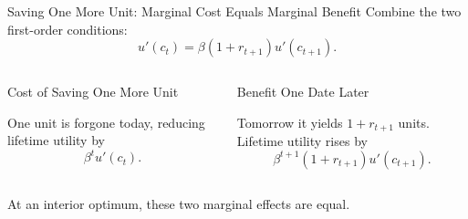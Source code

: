\documentclass[11pt,aspectratio=169,c]{beamer}
\begin{document}
\begin{frame}{Saving One More Unit: Marginal Cost Equals Marginal Benefit}
  Combine the two first-order conditions:
  \[
    \boxed{
      u'(c_t)
      =
      \beta(1+r_{t+1})u'(c_{t+1}).
    }
  \]

  \begin{columns}[t,onlytextwidth]
    \begin{column}{\tightcolumnwidth}
      \begin{block}{Cost of Saving One More Unit}
        \begin{minipage}[t][1.75cm][t]{\dimexpr\linewidth-.76em\relax}
          One unit is forgone today, reducing lifetime utility by
          \[
            \beta^t u'(c_t).
          \]
        \end{minipage}
      \end{block}
    \end{column}
    \hspace{\twocolumngutter}
    \begin{column}{\tightcolumnwidth}
      \begin{block}{Benefit One Date Later}
        \begin{minipage}[t][1.75cm][t]{\dimexpr\linewidth-.76em\relax}
          Tomorrow it yields $1+r_{t+1}$ units. Lifetime utility rises by
          \[
            \beta^{t+1}(1+r_{t+1})u'(c_{t+1}).
          \]
        \end{minipage}
      \end{block}
    \end{column}
  \end{columns}

  \vspace{.25em}
  At an interior optimum, these two marginal effects are equal.
\end{frame}
\end{document}
